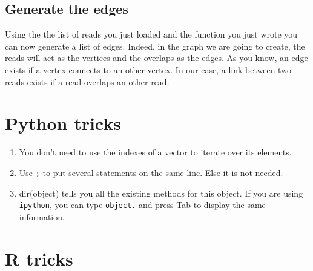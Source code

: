 \documentclass[a4paper,11pt]{article}
\begin{document}
\subsection{Generate the edges}
Using the the list of reads you just loaded and the function you just wrote you can now generate a list of edges. Indeed, in the graph we are going to create, the reads will act as the vertices and the overlaps as the edges. As you know, an edge exists if a vertex connects to an other vertex. In our case, a link between two reads exists if a read overlaps an other read.

\newpage

\section{Python tricks}
\begin{enumerate}
\item You don't need to use the indexes of a vector to iterate over its elements.
\item Use \texttt{;} to put several statements on the same line. Else it is not needed.
\item dir(object) tells you all the existing methods for this object. If you are using
\texttt{ipython}, you can type \texttt{object.} and press Tab to display the same information.
\end{enumerate}

\section{R tricks}
\end{document}
